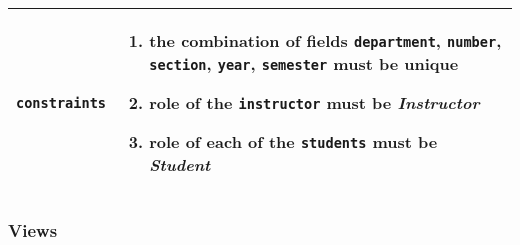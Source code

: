 \begin{table}[H]
\begin{tabular}[H]{r|p{4in}}
        \texttt{constraints} & 
            \vspace{-7mm}
            \begin{enumerate}[leftmargin=5mm, itemsep=0em, parsep=0em]
                \item the combination of fields \texttt{department},
                        \texttt{number},
                        \hspace{2em}\texttt{section},
                        \texttt{year},
                        \texttt{semester} must be unique
                \item role of the \texttt{instructor} must be \emph{Instructor}
                \item role of each of the \texttt{students} must be
                        \emph{Student}
            \end{enumerate} \vspace{-9mm}\\
        \hline
    \end{tabular}
    \renewcommand{\arraystretch}{1}
    
\end{table}

\subsubsection{Views}

